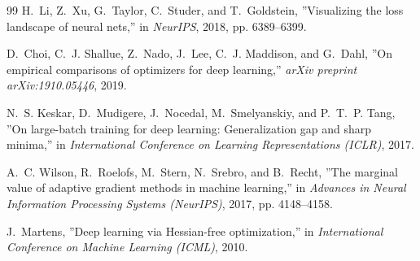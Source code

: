 \documentclass[20pt]{article}
\begin{document}
\begin{thebibliography}{99}
H.~Li, Z.~Xu, G.~Taylor, C.~Studer, and T.~Goldstein,
''Visualizing the loss landscape of neural nets,''
in \emph{NeurIPS}, 2018, pp. 6389--6399.

D.~Choi, C.~J. Shallue, Z.~Nado, J.~Lee, C.~J. Maddison, and G.~Dahl,
''On empirical comparisons of optimizers for deep learning,''
\emph{arXiv preprint arXiv:1910.05446}, 2019.

N.~S. Keskar, D.~Mudigere, J.~Nocedal, M.~Smelyanskiy, and P.~T.~P. Tang,
''On large-batch training for deep learning: Generalization gap and sharp minima,''
in \emph{International Conference on Learning Representations (ICLR)}, 2017.

A.~C. Wilson, R.~Roelofs, M.~Stern, N.~Srebro, and B.~Recht,
''The marginal value of adaptive gradient methods in machine learning,''
in \emph{Advances in Neural Information Processing Systems (NeurIPS)}, 2017, pp. 4148--4158.

J.~Martens,
''Deep learning via Hessian-free optimization,''
in \emph{International Conference on Machine Learning (ICML)}, 2010.

\end{thebibliography}
\end{document}
